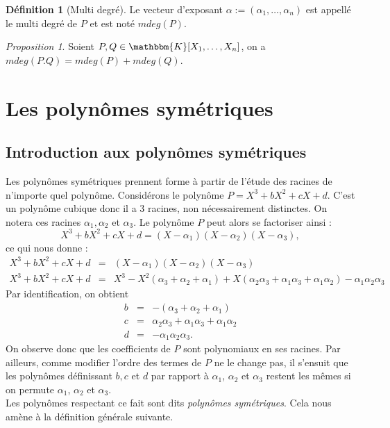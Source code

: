 \documentclass[12pt]{article}
\theoremstyle{remark}\newtheorem{note}{Note}
\theoremstyle{remark}\newtheorem{nota}{Notation}
\newcommand{\K}{\mathbbm{K}}
\newtheorem{prop}{Proposition}
\theoremstyle{definition}
\newtheorem{definition}{Définition}
\begin{document}
\begin{definition}[Multi degré]
Le vecteur d'exposant $\alpha := (\alpha_1,\ldots, \alpha_n)$ est appellé le multi degré de $P$ et est noté $mdeg(P)$.
\end{definition}

\begin{prop}
Soient $P,Q \in\K[X_1, \ldots, X_n]$, on a $mdeg(P.Q) = mdeg(P) + mdeg(Q)$.
\end{prop}

\pagebreak

\section{Les polynômes symétriques}

\subsection{Introduction aux polynômes symétriques}
Les polynômes symétriques prennent forme à partir de l'étude des racines de n'importe quel polynôme. Considérons le polynôme $P=X^3 + bX^2 + cX + d$. C'est un polynôme cubique donc il a $3$ racines, non nécessairement distinctes. On notera ces racines $\alpha_1 , \alpha_2$ et $\alpha_3$.
Le polynôme $P$ peut alors se factoriser ainsi :
$$X^3 + bX^2 + cX + d = (X - \alpha_1)(X - \alpha_2)(X - \alpha_3),$$
ce qui nous donne :
\begin{eqnarray}
X^3 + bX^2 + cX + d &=& (X - \alpha_1)(X - \alpha_2)(X - \alpha_3) \nonumber \\
X^3 + bX^2 + cX + d &=& X^3 - X^2(\alpha_3 + \alpha_2 + \alpha_1) + X(\alpha_2 \alpha_3 + \alpha_1 \alpha_3 + \alpha_1 \alpha_2) - \alpha_1 \alpha_2 \alpha_3 \nonumber
\end{eqnarray}
Par identification, on obtient 
\begin{eqnarray}
b &=& -(\alpha_3 + \alpha_2 + \alpha_1) \nonumber \\
c &=& \alpha_2 \alpha_3 + \alpha_1 \alpha_3 + \alpha_1 \alpha_2 \nonumber \\
d &=& - \alpha_1 \alpha_2 \alpha_3. \nonumber 
\end{eqnarray}
On observe donc que les coefficients de $P$ sont polynomiaux en ses racines. Par ailleurs, comme modifier l'ordre des termes de $P$ ne le change pas, il s'ensuit que les polynômes définissant $b,c$ et $d$ par rapport à $\alpha_1$, $\alpha_2$ et $\alpha_3$ restent les mêmes si on permute $\alpha_1$, $\alpha_2$ et $\alpha_3$.\\
Les polynômes respectant ce fait sont dits \textit{polynômes symétriques}. Cela nous amène à la définition générale suivante.\\
\end{document}
